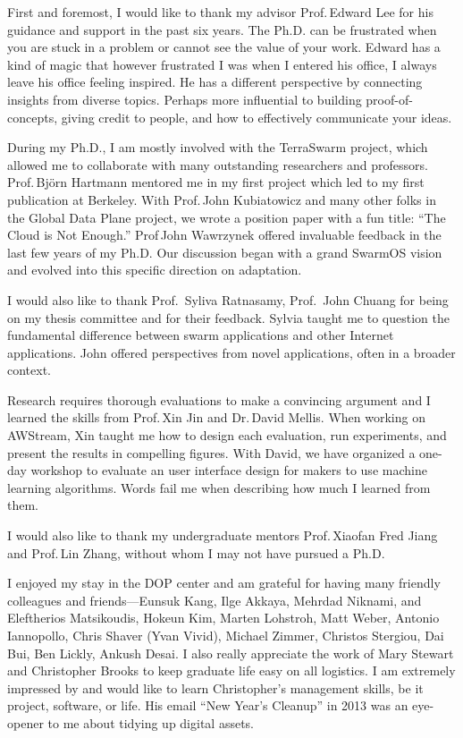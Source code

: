 \documentclass[thesis.tex]{subfiles}
\begin{document}
\begin{acknowledgements}

  First and foremost, I would like to thank my advisor Prof.\,Edward Lee for his
  guidance and support in the past six years. The Ph.D. can be frustrated when
  you are stuck in a problem or cannot see the value of your work. Edward has a
  kind of magic that however frustrated I was when I entered his office, I
  always leave his office feeling inspired. He has a different perspective by
  connecting insights from diverse topics. Perhaps more influential to building
  proof-of-concepts, giving credit to people, and how to effectively communicate
  your ideas.

  During my Ph.D., I am mostly involved with the TerraSwarm project, which
  allowed me to collaborate with many outstanding researchers and
  professors. Prof.\,Bj\"orn Hartmann mentored me in my first project which led
  to my first publication at Berkeley. With Prof.\,John Kubiatowicz and many
  other folks in the Global Data Plane project, we wrote a position paper with a
  fun title: ``The Cloud is Not Enough.'' Prof\,John Wawrzynek offered
  invaluable feedback in the last few years of my Ph.D. Our discussion began
  with a grand SwarmOS vision and evolved into this specific direction on
  adaptation.

  I would also like to thank Prof.\, Syliva Ratnasamy, Prof.\, John Chuang for
  being on my thesis committee and for their feedback. Sylvia taught me to
  question the fundamental difference between swarm applications and other
  Internet applications. John offered perspectives from novel applications,
  often in a broader context.

  Research requires thorough evaluations to make a convincing argument and I
  learned the skills from Prof.\,Xin Jin and Dr.\,David Mellis. When working on
  AWStream, Xin taught me how to design each evaluation, run experiments, and
  present the results in compelling figures. With David, we have organized a
  one-day workshop to evaluate an user interface design for makers to use
  machine learning algorithms. Words fail me when describing how much I learned
  from them.

  I would also like to thank my undergraduate mentors Prof.\,Xiaofan Fred Jiang
  and Prof.\,Lin Zhang, without whom I may not have pursued a Ph.D.

  I enjoyed my stay in the DOP center and am grateful for having many friendly
  colleagues and friends---Eunsuk Kang, Ilge Akkaya, Mehrdad Niknami, and
  Eleftherios Matsikoudis, Hokeun Kim, Marten Lohstroh, Matt Weber, Antonio
  Iannopollo, Chris Shaver (Yvan Vivid), Michael Zimmer, Christos Stergiou, Dai
  Bui, Ben Lickly, Ankush Desai. I also really appreciate the work of Mary
  Stewart and Christopher Brooks to keep graduate life easy on all logistics. I
  am extremely impressed by and would like to learn Christopher's management
  skills, be it project, software, or life. His email ``New Year's Cleanup'' in
  2013 was an eye-opener to me about tidying up digital assets.


\end{acknowledgements}
\end{document}

